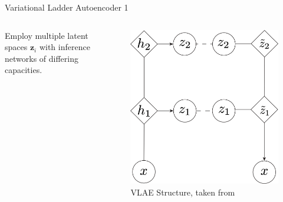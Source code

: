 \documentclass{beamer}
\begin{document}
    \begin{frame}{Variational Ladder Autoencoder 1}
        \begin{columns}
            \begin{column}{0.48\textwidth}
                Employ multiple latent spaces $\bm{z}_i$ with inference networks of differing capacities.
            \end{column}
            \begin{column}{0.48\textwidth}
                \begin{figure}
                    \centering
                    \includegraphics[width=\textwidth]{pres_imgs/vlae_structure.png}
                    \caption{VLAE Structure, taken from~\cite{zhao2017learning}}
                    \label{fig:vae_structure}
                \end{figure}
            \end{column}
        \end{columns}
    \end{frame}
\end{document}
